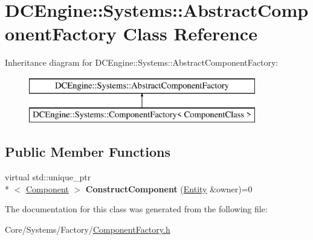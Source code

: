 \hypertarget{classDCEngine_1_1Systems_1_1AbstractComponentFactory}{\section{D\-C\-Engine\-:\-:Systems\-:\-:Abstract\-Component\-Factory Class Reference}
\label{classDCEngine_1_1Systems_1_1AbstractComponentFactory}
}
Inheritance diagram for D\-C\-Engine\-:\-:Systems\-:\-:Abstract\-Component\-Factory\-:\begin{figure}[H]
\begin{center}
\leavevmode
\includegraphics[height=2.000000cm]{classDCEngine_1_1Systems_1_1AbstractComponentFactory}
\end{center}
\end{figure}
\subsection*{Public Member Functions}
\begin{DoxyCompactItemize}
\item 
\hypertarget{classDCEngine_1_1Systems_1_1AbstractComponentFactory_a9276d79f8f72e74e7ffba6d576e1257a}{virtual std\-::unique\-\_\-ptr\\*
$<$ \hyperlink{classDCEngine_1_1Component}{Component} $>$ {\bfseries Construct\-Component} (\hyperlink{classDCEngine_1_1Entity}{Entity} \&owner)=0}\label{classDCEngine_1_1Systems_1_1AbstractComponentFactory_a9276d79f8f72e74e7ffba6d576e1257a}

\end{DoxyCompactItemize}


The documentation for this class was generated from the following file\-:\begin{DoxyCompactItemize}
\item 
Core/\-Systems/\-Factory/\hyperlink{ComponentFactory_8h}{Component\-Factory.\-h}\end{DoxyCompactItemize}
